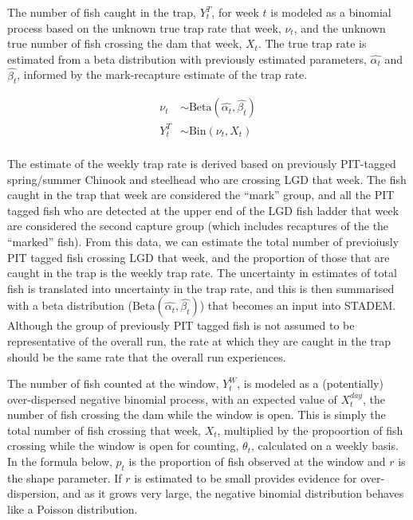 \documentclass[
  12pt,
]{article}
\begin{document}
The number of fish caught in the trap, \(Y^T_t\), for week \(t\) is modeled as a binomial process based on the unknown true trap rate that week, \(\nu_t\), and the unknown true number of fish crossing the dam that week, \(X_t\). The true trap rate is estimated from a beta distribution with previously estimated parameters, \(\hat{\alpha_t}\) and \(\hat{\beta_t}\), informed by the mark-recapture estimate of the trap rate.

\[
\begin{aligned}
  \nu_t &\sim \text{Beta} \left(\hat{\alpha_t}, \hat{\beta_t} \right) \\
  Y^T_t &\sim \text{Bin} \left( \nu_t, X_t \right) \\
\end{aligned}
\]

The estimate of the weekly trap rate is derived based on previously PIT-tagged spring/summer Chinook and steelhead who are crossing LGD that week. The fish caught in the trap that week are considered the ``mark'' group, and all the PIT tagged fish who are detected at the upper end of the LGD fish ladder that week are considered the second capture group (which includes recaptures of the the ``marked'' fish). From this data, we can estimate the total number of previoiusly PIT tagged fish crossing LGD that week, and the proportion of those that are caught in the trap is the weekly trap rate. The uncertainty in estimates of total fish is translated into uncertainty in the trap rate, and this is then summarised with a beta distribution (\(\text{Beta} \left(\hat{\alpha_t}, \hat{\beta_t} \right)\)) that becomes an input into STADEM. Although the group of previously PIT tagged fish is not assumed to be representative of the overall run, the rate at which they are caught in the trap should be the same rate that the overall run experiences.

The number of fish counted at the window, \(Y^W_t\), is modeled as a (potentially) over-dispersed negative binomial process, with an expected value of \(X_t^{day}\), the number of fish crossing the dam while the window is open. This is simply the total number of fish crossing that week, \(X_t\), multiplied by the propoortion of fish crossing while the window is open for counting, \(\theta_t\), calculated on a weekly basis. In the formula below, \(p_t\) is the proportion of fish observed at the window and \(r\) is the shape parameter. If \(r\) is estimated to be small provides evidence for over-dispersion, and as it grows very large, the negative binomial distribution behaves like a Poisson distribution.
\end{document}
